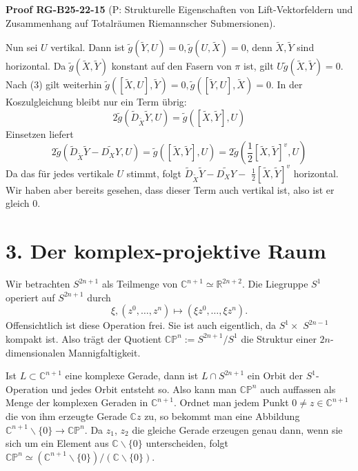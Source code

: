 \documentclass[10pt, letterpaper]{article}
\newcommand{\CustomHeading}[3]{%
  \par\medskip\noindent%
  \textbf{#1 #2} \textnormal{(#3)}.\enskip%
}
\newenvironment{PROOF}[2]{\begin{unitbox}\CustomHeading{Proof}{#1}{#2}}{\end{unitbox}}
\begin{document}
\begin{PROOF}{RG-B25-22-15}{P: Strukturelle Eigenschaften von Lift-Vektorfeldern und Zusammenhang auf Totalräumen Riemannscher Submersionen}
Nun sei $U$ vertikal. Dann ist $\tilde{g}(\tilde{Y}, U)=0, \tilde{g}(U, \tilde{X})=0$, denn $\tilde{X}, \tilde{Y}$ sind horizontal. Da $\tilde{g}(\tilde{X}, \tilde{Y})$ konstant auf den Fasern von $\pi$ ist, gilt $U \tilde{g}(\tilde{X}, \tilde{Y})=0$. Nach (3) gilt weiterhin $\tilde{g}([\tilde{X}, U], \tilde{Y})=0, \tilde{g}([\tilde{Y}, U], \tilde{X})=0$. In der Koszulgleichung bleibt nur ein Term übrig:
$$
2 \tilde{g}\left(\tilde{D}_{\tilde{X}} \tilde{Y}, U\right)=\tilde{g}([\tilde{X}, \tilde{Y}], U)
$$
Einsetzen liefert
$$
2 \tilde{g}\left(\tilde{D}_{\tilde{X}} \tilde{Y}-\widetilde{D_{X} Y}, U\right)=\tilde{g}([\tilde{X}, \tilde{Y}], U)=2 \tilde{g}\left(\frac{1}{2}[\tilde{X}, \tilde{Y}]^{v}, U\right)
$$
Da das für jedes vertikale $U$ stimmt, folgt $\tilde{D}_{\tilde{X}} \tilde{Y}-\widetilde{D_{X} Y}-$ $\frac{1}{2}[\tilde{X}, \tilde{Y}]^{v}$ horizontal. Wir haben aber bereits gesehen, dass dieser Term auch vertikal ist, also ist er gleich 0.
\end{PROOF}




\pagebreak



\section*{3. Der komplex-projektive Raum}



Wir betrachten $S^{2 n+1}$ als Teilmenge von $\mathbb{C}^{n+1} \simeq \mathbb{R}^{2 n+2}$. Die Liegruppe $S^{1}$ operiert auf $S^{2 n+1}$ durch
$$
\xi,\left(z^{0}, \ldots, z^{n}\right) \mapsto\left(\xi z^{0}, \ldots, \xi z^{n}\right) .
$$
Offensichtlich ist diese Operation frei. Sie ist auch eigentlich, da $S^{1} \times$ $S^{2 n-1}$ kompakt ist. Also trägt der Quotient $\mathbb{C} \mathbb{P}^{n}:=S^{2 n+1} / S^{1}$ die Struktur einer $2 n$-dimensionalen Mannigfaltigkeit.


Ist $L \subset \mathbb{C}^{n+1}$ eine komplexe Gerade, dann ist $L \cap S^{2 n+1}$ ein Orbit der $S^{1}$-Operation und jedes Orbit entsteht so. Also kann man $\mathbb{C P}^{n}$ auch auffassen als Menge der komplexen Geraden in $\mathbb{C}^{n+1}$. Ordnet man jedem Punkt $0 \neq z \in \mathbb{C}^{n+1}$ die von ihm erzeugte Gerade $\mathbb{C} z$ zu, so bekommt man eine Abbildung $\mathbb{C}^{n+1} \backslash\{0\} \rightarrow \mathbb{C} \mathbb{P}^{n}$. Da $z_{1}$, $z_{2}$ die gleiche Gerade erzeugen genau dann, wenn sie sich um ein Element aus $\mathbb{C} \backslash\{0\}$ unterscheiden, folgt $\mathbb{C P}^{n} \simeq\left(\mathbb{C}^{n+1} \backslash\{0\}\right) /(\mathbb{C} \backslash\{0\})$.
\end{document}
